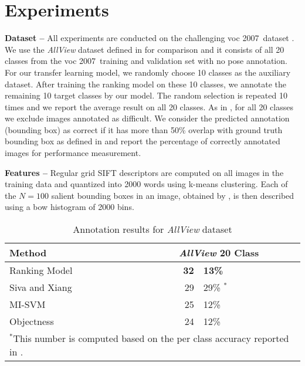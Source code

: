 \documentclass{bmvc2k}
\def\vocs{{\sc voc} 2007}
\def\bow{{{\sc b}o{\sc w} }}
\begin{document}
\section{Experiments}
\label{sec:experiments}


\noindent \textbf{Dataset --} All experiments are conducted on the challenging \vocs~dataset \cite{pascalvoc2007}. We use the \textit{AllView} dataset defined in \cite{Sivaiccv2011} for comparison and it consists of all 20 classes from the \vocs~training and validation set with no pose annotation. For our transfer learning model, we randomly choose 10 classes as the auxiliary dataset. After training the ranking model on these 10 classes, we annotate the remaining 10 target classes by our model.  The random selection is repeated 10 times and we report the average result on all 20 classes. As in \cite{Pandeyiccv2011,Sivaiccv2011}, for all 20 classes we exclude images annotated as difficult. We consider the predicted annotation (bounding box) as correct if it has more than 50\% overlap with ground truth bounding box as defined in \cite{pascalvoc2007} and report the percentage of correctly annotated images for performance measurement.



\noindent \textbf{Features --} Regular grid SIFT descriptors are computed on all images in the training data and quantized into 2000 words using k-means clustering. Each of the $N=100$ salient bounding boxes in an image, obtained by \cite{Alexewhatisobject}, is then described using a \bow histogram of 2000 bins.

\begin{table}[h]
\begin{center}
\begin{tabular}{l r @{.} l}
\hline
\textbf{Method} & 
\multicolumn{2}{c}{ \textbf{\emph{AllView} 20 Class}} \\
\hline
Ranking Model & \quad \quad \quad \quad \textbf{32}&\textbf{13\%} \\
\hline
Siva and Xiang \cite{Sivaiccv2011} & 29&29\% $^{*}$ \\
\hline
MI-SVM \cite{Andrews03supportvector} & 25&12\%\\
\hline
Objectness \cite{Alexewhatisobject} & 24&12\%\\
\hline
\multicolumn{3}{l}{{\scriptsize$^{*}$This number is computed based on the per class accuracy reported in \cite{Sivaiccv2011}.}}
\end{tabular}

\end{center}

\caption{Annotation results for \emph{AllView} dataset}
\label{results_ranking}
\end{table}
\end{document}
